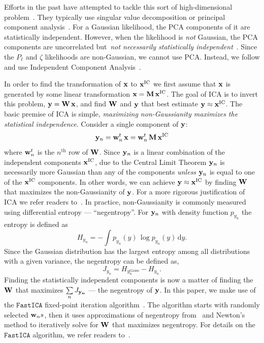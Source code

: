 \documentclass[12pt, letterpaper, preprint]{aastex}
\newcommand{\beq}{\begin{equation}}
\newcommand{\eeq}{\end{equation}}
\begin{document}
Efforts in the past have attempted to tackle this sort of 
high-dimensional problem~\citep[\emph{e.g.}][]{scoccimarro2000,eisenstein2001,gaztanaga2005,norberg2009,sinha2017}.
They typically use singular value decomposition or principal 
component analysis~\citep[PCA;][]{Press:1992:NRC:148286}. For a Gaussian
likelihood, the PCA components of it are statistically independent. 
However, when the likelihood is \emph{not} Gaussian, the PCA components 
are uncorrelated but~\emph{not necessarily statistically independent}~\citep{hartlap2009}. 
Since the $P_\ell$ and $\zeta$ likelihoods are non-Gaussian, we cannot 
use PCA. Instead, we follow \cite{hartlap2009} and use Independent 
Component Analysis~\citep[ICA][]{herault1984,comon1994,hyvarinen2000,
hyvarinen2001independent}. 

In order to find the transformation of ${\bf x}$ to ${\bf x}^\mathrm{IC}$ 
we first assume that ${\bf x}$ is generated by some linear transformation
${\bf x} = {\bf M}\,{\bf x}^\mathrm{IC}$. The goal of ICA is to invert 
this problem, ${\bf y} = {\bf W}\,{\bf x}$, and find ${\bf W}$ and ${\bf y}$ 
that best estimate ${\bf y} \approx {\bf x}^\mathrm{IC}$. The basic 
premise of ICA is simple, \emph{maximizing non-Gaussianity maximizes the 
statistical independence}. Consider a single component of ${\bf y}$: 
\beq
{\bf y}_n = {\bf w}_n^{\tiny t}\,{\bf x} = {\bf w}_n^{\tiny t}\,{\bf M}\,{\bf x}^\mathrm{IC} 
\eeq
where ${\bf w}_n^{\tiny t}$ is the $n^\mathrm{th}$ row of ${\bf W}$. 
Since ${\bf y}_n$ is a linear combination of the independent 
components ${\bf x}^\mathrm{IC}$, due to the Central Limit Theorem 
${\bf y}_n$ is necessarily more Gaussian than any of the 
components \emph{unless} ${\bf y}_n$ is equal to one of the 
${\bf x}^\mathrm{IC}$ components. In other words, we can achieve 
${\bf y} \approx {\bf x}^\mathrm{IC}$ by finding ${\bf W}$ that 
maximizes the non-Gaussianity of ${\bf y}$. For a more rigorous 
justification of ICA we refer readers to~\cite{hyvarinen2001independent}. 
In practice, non-Gaussianity is commonly measured using differential
entropy --- ``negentropy''. For ${\bf y}_n$ with density function 
$p_{y_n}$ the entropy is defined as
\beq
H_{y_n} =  - \int p_{y_n} (y)\, \log p_{y_n}(y)\, \mathrm{d}y. 
\eeq
Since the Gaussian distribution has the largest entropy among all 
distributions with a given variance, the negentropy can be defined 
as, 
\beq
J_{y_n} = H_{y_n^\mathrm{Gauss}} - H_{y_n}. 
\eeq
Finding the statistically independent components is now a matter
of finding the ${\bf W}$ that maximizes $\sum\limits_{n} J_{\bf y_n}$
--- the negentropy of ${\bf y}$. In this paper, we make use of the 
$\mathtt{FastICA}$ fixed-point iteration algorithm~\citep{hyvarinen1999}. 
The algorithm starts with randomly selected ${\bf w}_ns$, then it uses 
approximations of negentropy from~\cite{hyvarinen1998} and Newton's method 
to iteratively solve for ${\bf W}$ that maximizes negentropy. For details 
on the $\mathtt{FastICA}$ algorithm, we refer readers to~\cite{hyvarinen1999}.
\end{document}
